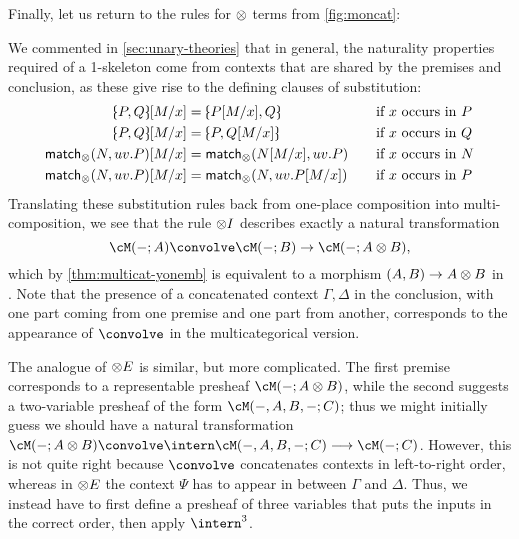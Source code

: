 Finally, let us return to the rules for $\otimes$ terms from \cref{fig:moncat}:
We commented in \cref{sec:unary-theories} that in general, the naturality properties required of a 1-skeleton come from contexts that are shared by the premises and conclusion, as these give rise to the defining clauses of substitution:
\begin{align*}
  \tpair P Q[M/x] &= \tpair{P[M/x]}{Q} &&\quad\text{if $x$ occurs in $P$}\\
  \tpair P Q[M/x] &= \tpair{P}{Q[M/x]} &&\quad\text{if $x$ occurs in $Q$}\\
  \match_\tensor(N,uv.P)[M/x] &= \match_\tensor(N[M/x],uv.P) &&\quad\text{if $x$ occurs in $N$}\\
  \match_\tensor(N,uv.P)[M/x] &= \match_\tensor(N,uv.P[M/x]) &&\quad\text{if $x$ occurs in $P$}
\end{align*}
Translating these substitution rules back from one-place composition into multi-composition, we see that the rule $\mathord{\otimes}I$ describes exactly a natural transformation
\[\cM(-;A)\convolve \cM(-;B) \to \cM(-;A\tensor B),\]
which by \cref{thm:multicat-yonemb} is equivalent to a morphism $(A,B)\to A\otimes B$ in \cM.
Note that the presence of a concatenated context $\Gamma,\Delta$ in the conclusion, with one part coming from one premise and one part from another, corresponds to the appearance of $\convolve$ in the multicategorical version.

The analogue of $\mathord{\otimes}E$ is similar, but more complicated.
The first premise corresponds to a representable presheaf $\cM(-;A\tensor B)$, while the second suggests a two-variable presheaf of the form $\cM(-,A,B,-;C)$; thus we might initially guess we should have a natural transformation
$\cM(-;A\tensor B) \convolve \intern\cM(-,A,B,-;C) \too \cM(-;C)$.
However, this is not quite right because $\convolve$ concatenates contexts in left-to-right order, whereas in $\mathord{\otimes}E$ the context $\Psi$ has to appear in between $\Gamma$ and $\Delta$.
Thus, we instead have to first define a presheaf of three variables that puts the inputs in the correct order, then apply $\intern^3$.


